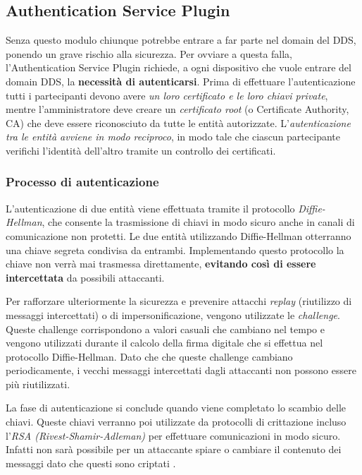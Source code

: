 \subsection{Authentication Service Plugin}
Senza questo modulo chiunque potrebbe entrare a far parte nel domain
del DDS, ponendo un grave rischio alla sicurezza. Per ovviare a questa
falla, l'Authentication Service Plugin richiede, a ogni dispositivo che 
vuole entrare del domain DDS, la \textbf{necessità di autenticarsi}.
Prima di effettuare l'autenticazione tutti i partecipanti devono 
avere \textit{un loro certificato e le loro chiavi private}, mentre 
l'amministratore deve creare un \textit{certificato root}
(o Certificate Authority, CA) 
che deve essere riconosciuto da tutte le entità autorizzate. 
L'\textit{autenticazione tra le entità avviene in modo reciproco}, 
in modo tale che ciascun partecipante verifichi l'identità dell'altro
tramite un controllo dei certificati.


\subsubsection{Processo di autenticazione}
L'autenticazione di due entità viene effettuata
tramite il protocollo \textit{Diffie-Hellman}, che consente la trasmissione 
di chiavi in modo sicuro anche in canali di comunicazione non protetti.
Le due entità utilizzando Diffie-Hellman otterranno una chiave 
segreta condivisa da entrambi. Implementando questo 
protocollo la chiave non verrà mai 
trasmessa direttamente, \textbf{evitando così di essere intercettata} da 
possibili attaccanti. 

Per rafforzare ulteriormente la sicurezza e prevenire attacchi \textit{replay} 
(riutilizzo di messaggi intercettati) o di impersonificazione, vengono 
utilizzate le \textit{challenge}. Queste challenge corrispondono a valori 
casuali che cambiano nel tempo e vengono utilizzati durante il 
calcolo della firma digitale che si effettua nel protocollo
Diffie-Hellman.
Dato che che queste challenge cambiano periodicamente,
i vecchi messaggi intercettati dagli attaccanti non possono essere 
più riutilizzati.

La fase di autenticazione si conclude quando viene completato
lo scambio delle chiavi.
Queste chiavi verranno poi utilizzate da protocolli di 
crittazione incluso l'\textit{RSA (Rivest-Shamir-Adleman)} per effettuare 
comunicazioni in modo sicuro. Infatti non sarà possibile per un 
attaccante spiare o cambiare il contenuto dei messaggi dato 
che questi sono criptati 
\cite{DBLP:conf/asiaccs/WangLG24}.
\label{Processo di autenticazione}

